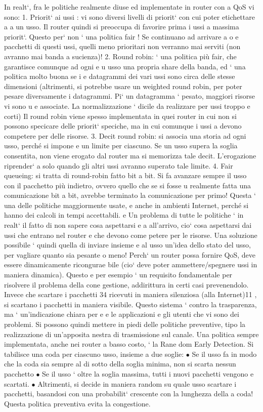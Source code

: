 \documentclass[a4paper,12pt]{article}
\begin{document}
In realt`, fra le politiche realmente diuse ed implementate in router con
a
QoS vi sono:
1. Priorit` ai ussi : vi sono diversi livelli di priorit` con cui poter etichettare
a
a
un usso. Il router quindi si preoccupa di favorire prima i ussi a massima
priorit`. Questo per` non ` una politica fair ! Se continuano ad arrivare
a
o
e
pacchetti di questi ussi, quelli meno prioritari non verranno mai serviti
(non avranno mai banda a sucienza)!
2. Round robin: ` una politica più fair, che garantisce comunque ad ogni
e
u
usso una propria share della banda, ed ` una politica molto buona se i
e
datagrammi dei vari ussi sono circa delle stesse dimensioni (altrimenti,
si potrebbe usare un weighted round robin, per poter pesare diversamente
i datagrammi. Pi` un datagramma ` pesato, maggiori risorse vi sono
u
e
associate. La normalizzazione ` dicile da realizzare per ussi troppo
e
corti) Il round robin viene spesso implementata in quei router in cui non
si possono specicare delle priorit` speciche, ma in cui comunque i ussi
a
devono competere per delle risorse.
3. Decit round robin: si associa una storia ad ogni usso, perché si impone
e
un limite per ciascuno. Se un usso supera la soglia consentita, non viene
erogato dal router ma si memorizza tale decit. L'erogazione riprender`
a
solo quando gli altri ussi avranno superato tale limite.
4. Fair queueing: si tratta di round-robin fatto bit a bit. Si fa avanzare
sempre il usso con il pacchetto più indietro, ovvero quello che se si fosse
u
realmente fatta una comunicazione bit a bit, avrebbe terminato la comunicazione per primo! Questa ` una delle politiche
maggiormente usate,
e
anche in ambienti Internet, perché si hanno dei calcoli in tempi accettabili.
e
Un problema di tutte le politiche ` in realt` il fatto di non sapere cosa aspettarsi
e
a
all'arrivo, cio` cosa aspettarsi dai ussi che entrano nel router e che devono come
petere per le risorse. Una soluzione possibile ` quindi quella di inviare insieme
e
al usso un'idea dello stato del usso, per vagliare quanto sia pesante o meno!
Perch` un router possa fornire QoS, deve essere dinamicamente ricongurae
bile (cio` deve poter ammettere/spegnere ussi in maniera dinamica). Questo
e
per esempio ` un requisito fondamentale per risolvere il problema della cone
gestione, addirittura in certi casi prevenendolo. Invece che scartare i pacchetti
34
ricevuti in maniera silenziosa (alla Internet)11 , si scartano i pacchetti in maniera
visibile. Questo sistema ` contro la trasparenza, ma ` un'indicazione chiara per
e
e
le applicazioni e gli utenti che vi sono dei problemi. Si possono quindi mettere
in piedi delle politiche preventive, tipo la realizzazione di un'apposita nestra di
trasmissione sul canale.
Una politica sempre implementata, anche nei router a basso costo, ` la Rane
dom Early Detection. Si tabilisce una coda per ciascuno usso, insieme a due
soglie:
$\bullet$ Se il usso fa in modo che la coda sia sempre al di sotto della soglia
minima, non si scarta nessun pacchetto
$\bullet$ Se il usso ` oltre la soglia massima, tutti i nuovi pacchetti vengono
e
scartati.
$\bullet$ Altrimenti, si decide in maniera random su quale usso scartare i pacchetti, basandosi con una probabilit`
crescente con la lunghezza della
a
coda!
Questa politica preventiva evita la congestione.
\end{document}
